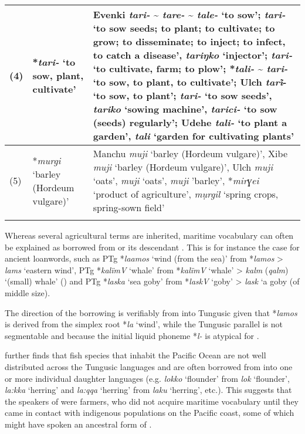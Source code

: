 \documentclass[output=paper,colorlinks,citecolor=brown]{langscibook}
\begin{document}
\begin{table}
\begin{tabularx}{\textwidth}{ l >{\raggedright\arraybackslash}p{2.5cm} Q }
(4) & *\textit{tari-} ‘to sow, plant, cultivate’ & Evenki \textit{tari-} {\textasciitilde} \textit{tare-} {\textasciitilde} \textit{tale-} ‘to sow’;  \textit{tari-} ‘to sow seeds; to plant; to cultivate; to grow; to disseminate; to inject; to infect, to catch a disease’, \textit{tariŋko} ‘injector’;  \textit{tari-} ‘to cultivate, farm; to plow’;  *\textit{tali-} {\textasciitilde} \textit{tari-} ‘to sow, to plant, to cultivate’; Ulch \textit{tari̇}- ‘to sow, to plant’;   \textit{tari-} ‘to sow seeds’, \textit{tariko} ‘sowing machine’, \textit{tarici-} ‘to sow (seeds) regularly’; Udehe \textit{tali-} ‘to plant a garden’, \textit{tali} ‘garden for cultivating plants’\\
\midrule
(5) & *\textit{murgi}  ‘barley (Hordeum vulgare)’ & Manchu \textit{muji} ‘barley (Hordeum vulgare)’, Xibe \textit{muji} ‘barley (Hordeum vulgare)’, Ulch \textit{muji} ‘oats’,  \textit{muji} ‘oats’,  \textit{muji} 'barley',  *\textit{mirɣei} ‘product of agriculture’,  \textit{mụrgil} ‘spring crops, spring-sown field’\\
\lspbottomrule
\end{tabularx}
\end{table}

Whereas several agricultural terms are inherited, maritime vocabulary can often be explained as borrowed from  or its descendant . This is for instance the case for ancient loanwords, such as PTg *\textit{laamos} ‘wind (from the sea)’ from  *\textit{lamos} >  \textit{lams} ‘eastern wind’, PTg *\textit{kalïmV} ‘whale’ from  *\textit{kalïmV} ‘whale’ >  \textit{kalm} (\textit{qalm}) ‘(small) whale’ (\citealt{Janhunen2016}) and PTg *\textit{laska} ‘sea goby’ from  *\textit{laskV} ‘goby’ >  \textit{lask} ‘a goby (of middle size).

The direction of the borrowing is verifiably from  into Tungusic given that  *\textit{lamos} is derived from the simplex root *\textit{la} ‘wind’, while the Tungusic parallel is not segmentable and because the initial liquid phoneme *\textit{l-} is atypical for .

\citet{Korovina2011} further finds that fish species that inhabit the Pacific Ocean are not well distributed across the Tungusic languages and are often borrowed from  into one or more individual daughter languages (e.g.  \textit{lokko} ‘flounder’ from  \textit{lok} ‘flounder’,  \textit{la:kka} ‘herring’ and  \textit{la:qqa} ‘herring’ from  \textit{laku} ‘herring’, etc.). This suggests that the speakers of  were farmers, who did not acquire maritime vocabulary until they came in contact with indigenous populations on the Pacific coast, some of which might have spoken an ancestral form of .
\end{document}
